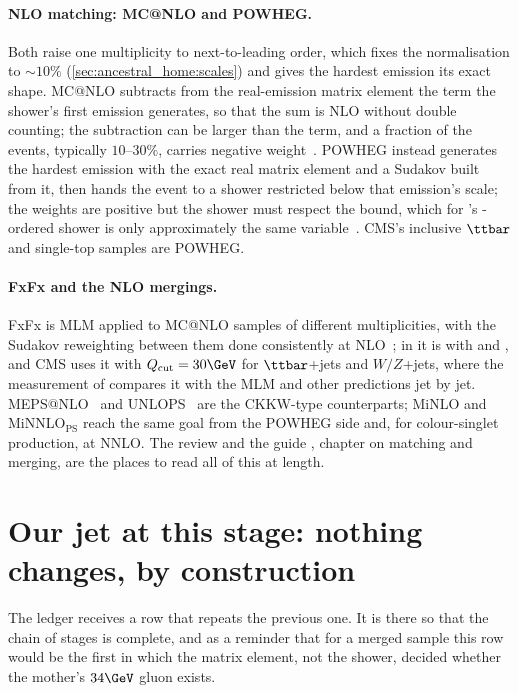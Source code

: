 \paragraph{NLO matching: MC@NLO and POWHEG.} Both raise one multiplicity to
next-to-leading order, which fixes the normalisation to $\sim10\%$
(\cref{sec:ancestral_home:scales}) and gives the hardest emission
its exact shape. MC@NLO subtracts from the real-emission matrix element the
term the shower's first emission generates, so that the sum is NLO without
double counting; the subtraction can be larger than the term, and a fraction
of the events, typically $10$--$30\%$, carries negative
weight~\cite{Frixione:2002ik,Alwall:2014hca}. POWHEG instead generates the
hardest emission with the exact real matrix element and a Sudakov built from
it, then hands the event to a shower restricted below that emission's
scale; the weights are positive but the shower must respect the
 bound, which for \PYTHIA's \pt-ordered shower is only
approximately the same variable~\cite{Nason:2004rx,Frixione:2007vw}. CMS's
inclusive $\ttbar$ and single-top samples are POWHEG.

\paragraph{FxFx and the NLO mergings.} FxFx is MLM applied to MC@NLO
samples of different multiplicities, with the Sudakov reweighting between
them done consistently at NLO~\cite{Frederix:2012ps,Frederix:2015eii}; in
\PYTHIA it is  with 
and , and CMS uses it with $Q_{\mathrm{cut}}=30\GeV$
for $\ttbar$+jets and $W/Z$+jets, where the measurement of
\cite{CMS:2022ilp} compares it with the MLM and other predictions jet by
jet. MEPS@NLO~\cite{Hoeche:2012yf} and UNLOPS~\cite{Lonnblad:2012ix} are the
CKKW-type counterparts; MiNLO and MiNNLO$_{\mathrm{PS}}$
\cite{Hamilton:2012np,Monni:2019whf} reach the same goal from the POWHEG
side and, for colour-singlet production, at NNLO. The review
\cite{Buckley:2011ms} and the \PYTHIA guide \cite{Bierlich:2022pfr},
chapter on matching and merging, are the places to read all of this at
length.

\section{Our jet at this stage: nothing changes, by construction}
\label{sec:whose_child:our_jet}

The ledger receives a row that repeats the previous one. It is there so
that the chain of stages is complete, and as a reminder that for a merged
sample this row would be the first in which the matrix element, not the
shower, decided whether the mother's $34\GeV$ gluon exists.

